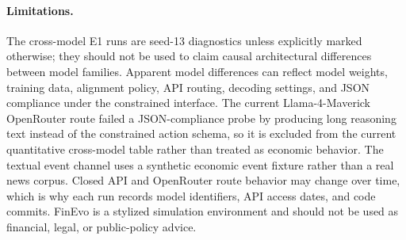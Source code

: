 \ifdefined\FinEvoAllowHistoricalPrePZeroEvidence\else
{}
\fi

\paragraph{Limitations.}
The cross-model E1 runs are seed-13 diagnostics unless explicitly marked
otherwise; they should not be used to claim causal architectural differences
between model families.  Apparent model differences can reflect model weights,
training data, alignment policy, API routing, decoding settings, and JSON
compliance under the constrained interface.  The current Llama-4-Maverick
OpenRouter route failed a JSON-compliance probe by producing long reasoning text
instead of the constrained action schema, so it is excluded from the current
quantitative cross-model table rather than treated as economic behavior.  The
textual event channel uses a synthetic economic event fixture rather than a real
news corpus.  Closed API and OpenRouter route behavior may change over time,
which is why each run records model identifiers, API access dates, and code
commits.  FinEvo is a stylized simulation environment and should not be used as
financial, legal, or public-policy advice.
